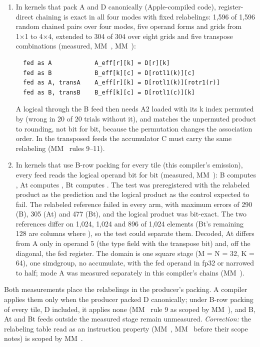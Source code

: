 \begin{enumerate}
\def\labelenumi{\arabic{enumi}.}
\item In kernels that pack A and D canonically (Apple-compiled  code), register-direct chaining is
  exact in all four modes with fixed relabelings: 1,596 of 1,596 random chained pairs over four modes, five operand
  forms and grids from 1×1 to 4×4, extended to 304 of 304 over eight grids and five transpose combinations (measured,
  MM~, MM~):

  \begin{lstlisting}
  fed as A            A_eff[r][k] = D[r][k]
  fed as B            B_eff[k][c] = D[rotl1(k)][c]
  fed as A, transA    A_eff[r][k] = D[rotl1(k)][rotr1(r)]
  fed as B, transB    B_eff[k][c] = D[rotl1(c)][k]
  \end{lstlisting}

  A logical  through the B feed then needs A2 loaded with its k index permuted by  (wrong in 20 of 20
  trials without it), and matches the unpermuted product to rounding, not bit for bit, because the permutation changes
  the association order. In the transposed feeds the accumulator C must carry the same relabeling (MM~ rules 9–11).
\item In kernels that use B-row packing for every tile (this compiler's  emission), every feed reads the
  logical operand bit for bit (measured, MM~): B computes , At computes , Bt computes
  . The test was preregistered with the relabeled product as the prediction and the logical
  product as the control expected to fail. The relabeled reference failed in every arm, with maximum errors of 290 (B), 305 (At) and 477 (Bt), and the logical product was bit-exact. The two references differ on
  1,024, 1,024 and 896 of 1,024 elements (Bt's remaining 128 are columns where ), so the test could
  separate them. Decoded, At differs from A only in operand 5 (the type field with the transpose bit) and, off the
  diagonal, the fed register. The domain is one square stage (M = N = 32, K = 64), one simdgroup, no accumulate, with
  the fed operand in fp32 or narrowed to half; mode A was measured separately in this compiler's chains (MM~).
\end{enumerate}

Both measurements place the relabelings in the producer's packing. A compiler applies them only when the producer packed D
canonically; under B-row packing of every tile, D included, it applies none (MM~ rule 9 as scoped by MM~),
and B, At and Bt feeds outside the measured stage remain unmeasured. \emph{Correction:} the relabeling table read as an instruction property (MM~,
MM~ before their scope notes) is scoped by MM~.

